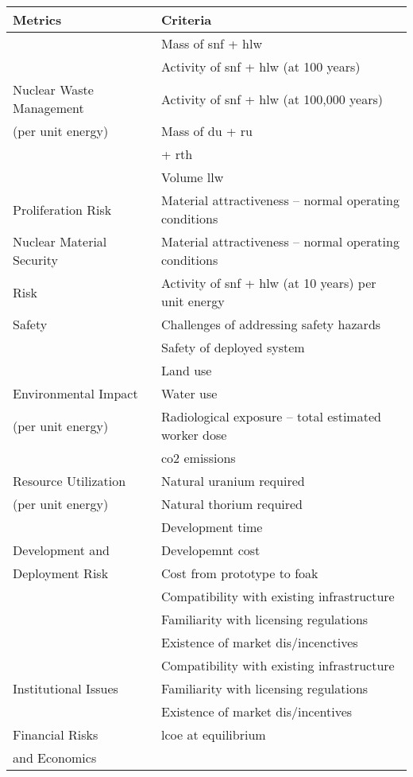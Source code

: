 \begin{tabular}{ll}
    \toprule
    Metrics & Criteria \\
    \midrule
     & Mass of \ac{snf} + \ac{hlw}\\
     & Activity of \ac{snf} + \ac{hlw} (at 100 years)\\
    Nuclear Waste Management & Activity of \ac{snf} + \ac{hlw} (at 100,000 years)\\
    (per unit energy) & Mass of \ac{du} + \ac{ru}\\
     & \hspace{12em}+ \ac{rth}\\
     & Volume \ac{llw}\\
     \midrule
     Proliferation Risk & Material attractiveness -- normal operating conditions\\
     \midrule
     Nuclear Material Security & Material attractiveness -- normal operating conditions\\
    Risk & Activity of \ac{snf} + \ac{hlw} (at 10 years) per unit energy\\
    \midrule
    Safety & Challenges of addressing safety hazards\\
    & Safety of deployed system\\
    \midrule
    & Land use\\
    Environmental Impact  & Water use\\
    (per unit energy) & Radiological exposure -- total estimated worker dose\\
     & \Ac{co2} emissions\\
     \midrule
     Resource Utilization & Natural uranium required\\
    (per unit energy) & Natural thorium required\\
    \midrule
    & Development time\\
    Development and & Developemnt cost\\
    Deployment Risk & Cost from prototype to \ac{foak}\\
    & Compatibility with existing infrastructure\\
    &Familiarity with licensing regulations\\
    & Existence of market dis/incenctives\\
    \midrule
      & Compatibility with existing infrastructure\\
    Institutional Issues & Familiarity with licensing regulations\\
     & Existence of market dis/incentives\\
     \midrule
    Financial Risks & \ac{lcoe} at equilibrium\\
    and Economics &\\
    \bottomrule
\end{tabular}